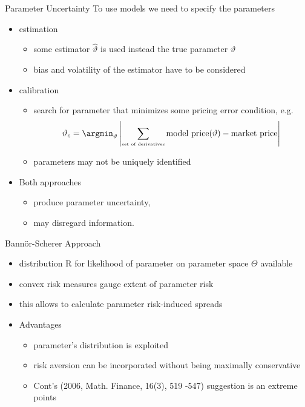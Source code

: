 {Parameter Uncertainty}
To use models we need to specify the parameters
\begin{itemize}
\item<1-> estimation
\begin{itemize}
\item some estimator $\hat{\vartheta}$ is used instead the true parameter $\vartheta$
\item bias and volatility of the estimator have to be considered
\end{itemize}
\item<2-> calibration
\begin{itemize}
\item search for parameter that minimizes some pricing error condition, e.g.
$$
\vartheta_c = \argmin_{\vartheta} \left| \sum_{\mbox{\tiny set of derivatives}} \mbox{model price} (\vartheta) - \mbox{market price} \right|
$$
\item parameters may not be uniquely identified
\end{itemize}
\item<3-> Both approaches
\begin{itemize}
\item produce parameter uncertainty,
\item may disregard information.
\end{itemize}
\end{itemize}




{Bann{\"o}r-Scherer Approach}
\begin{itemize}
\item<1-> distribution R for likelihood of parameter on parameter space $\Theta$  available
\item<2-> convex risk measures gauge extent of parameter risk
\item<3-> this allows to calculate parameter risk-induced spreads
\item<4-> Advantages
\begin{itemize}
\item  parameter's distribution is exploited
 \item risk aversion can be incorporated without being maximally conservative
\item Cont's (2006, Math. Finance, 16(3), 519 -547) suggestion is an extreme points
\end{itemize}
\end{itemize}




